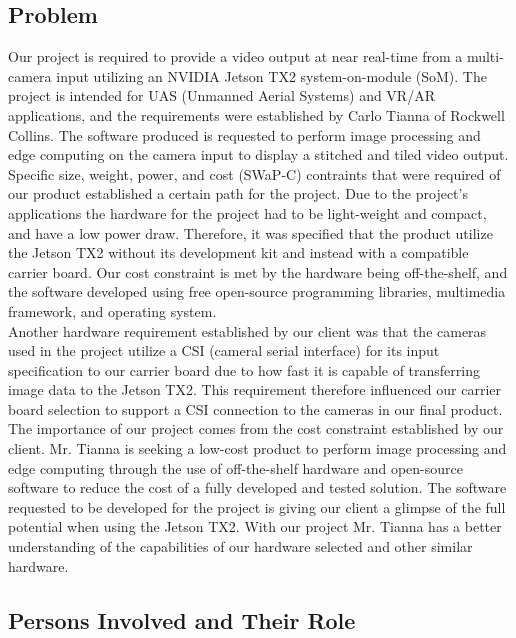 \subsection{Problem}

Our project is required to provide a video output at near real-time from a 
multi-camera input utilizing an NVIDIA Jetson TX2 system-on-module (SoM). 
The project is intended for UAS (Unmanned Aerial Systems) and VR/AR applications, 
and the requirements were established by Carlo Tianna of Rockwell Collins. 
The software produced is requested to perform image processing and edge computing on the 
camera input to display a stitched and tiled video output.  \\

Specific size, weight, power, and cost (SWaP-C) contraints that were required of our 
product established a certain path for the project. Due to the project's applications  
the hardware for the project had to be light-weight and compact, and have a low power 
draw. Therefore, it was specified that the product utilize the Jetson TX2 without its 
development kit and instead with a compatible carrier board. Our cost constraint is 
met by the hardware being off-the-shelf, and the software developed using free 
open-source programming libraries, multimedia framework, and operating system.  \\

Another hardware requirement established by our client was that the cameras used in
the project utilize a CSI (cameral serial interface) for its input specification to our 
carrier board due to how fast it is capable of transferring image data to the Jetson TX2. 
This requirement therefore influenced our carrier board selection to support a CSI 
connection to the cameras in our final product.  \\

The importance of our project comes from the cost constraint established by our client. 
Mr. Tianna is seeking a low-cost product to perform image processing and edge computing 
through the use of off-the-shelf hardware and open-source software to reduce the cost 
of a fully developed and tested solution. The software requested to be developed for 
the project is giving our client a glimpse of the full potential when using the Jetson 
TX2. With our project Mr. Tianna has a better understanding of the capabilities of our 
hardware selected and other similar hardware.  \\

\subsection{Persons Involved and Their Role}


